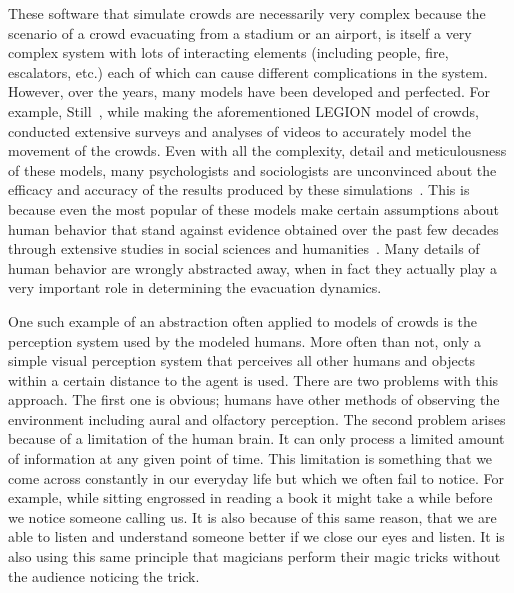 These software that simulate crowds are necessarily very complex because the scenario of a crowd evacuating from a stadium or an airport, is itself a very complex system with lots of interacting elements (including people, fire, escalators, etc.) each of which can cause different complications in the system. However, over the years, many models have been developed and perfected. For example, Still~\cite{Still:2000tp}, while making the aforementioned LEGION model of crowds, conducted extensive surveys and analyses of videos to accurately model the movement of the crowds. Even with all the complexity, detail and meticulousness of these models, many psychologists and sociologists are unconvinced about the efficacy and accuracy of the results produced by these simulations~\cite{Aguirre:2004tn,Torres:2010tj,Sime:1995uu}. This is because even the most popular of these models make certain assumptions about human behavior that stand against evidence obtained over the past few decades through extensive studies in social sciences and humanities~\cite{Torres:2010tj,Sime:1995uu}. Many details of human behavior are wrongly abstracted away, when in fact they actually play a very important role in determining the evacuation dynamics. 

One such example of an abstraction often applied to models of crowds is the perception system used by the modeled humans. More often than not, only a simple visual perception system that perceives all other humans and objects within a certain distance to the agent is used. There are two problems with this approach. The first one is obvious; humans have other methods of observing the environment including aural and olfactory perception. The second problem arises because of a limitation of the human brain. It can only process a limited amount of information at any given point of time. This limitation is something that we come across constantly in our everyday life but which we often fail to notice. For example, while sitting engrossed in reading a book it might take a while before we notice someone calling us. It is also because of this same reason, that we are able to listen and understand someone better if we close our eyes and listen. It is also using this same principle that magicians perform their magic tricks without the audience noticing the trick. 

